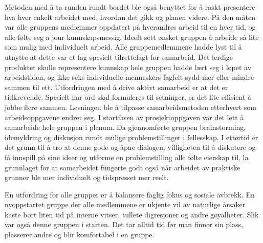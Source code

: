 Metoden med å ta runden rundt bordet ble også benyttet for å raskt presentere hva hver enkelt arbeidet med, hvordan det gikk og planen videre.
På den måten var alle gruppens medlemmer oppdatert på hverandres arbeid til en hver tid, og alle følte seg a jour kunnskapsmessig.
Ideelt sett ønsket gruppen å arbeide så lite som mulig med individuelt arbeid.
Alle gruppemedlemmene hadde lyst til å utnytte at dette var et fag spesielt tilrettelagt for samarbeid.
Det ferdige produktet skulle representere kunnskap hele gruppen hadde lært seg i løpet av arbeidstiden, og ikke seks individuelle menneskers fagfelt sydd mer eller mindre sammen til ett.
Utfordringen med å drive aktivt samarbeid er at det er tidkrevende.
Spesielt når ord skal formuleres til setninger, er det lite effisient å jobbe flere sammen.
Løsningen ble å tilpasse samarbeidsmetoden etterhvert som arbeidsoppgavene endret seg.
I startfasen av prosjektoppgaven var det lett å samarbeide hele gruppen i plenum.
Da gjennomførte gruppen brainstorming, idemyldring og diskusjon rundt mulige problemstillinger i fellesskap.
I ettertid er det grunn til å tro at denne gode og åpne dialogen, villigheten til å diskutere og få innspill på sine ideer og utforme en problemstilling alle følte eierskap til, la grunnlaget for at samarbeidet fungerte godt også når arbeidet av praktiske grunner ble mer individuelt og tidspresset mer reelt.




En utfordring for alle grupper er å balansere faglig fokus og sosiale avbrekk.
En nyoppstartet gruppe der alle medlemmene er ukjente vil av naturlige årsaker kaste bort liten tid på interne vitser, tullete digresjoner og andre gøyalheter.
Slik var også denne gruppen i starten. Det tar alltid tid før man finner sin plass, plasserer andre og blir komfortabel i en gruppe. 

